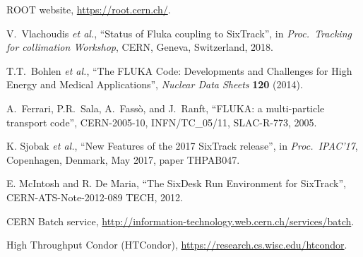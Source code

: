 \documentclass[a4paper,
              ]{jacow}
\begin{document}
\begin{thebibliography}{99}
 ROOT website, 
\url{https://root.cern.ch/}.


V.~Vlachoudis \emph{et al.}, ``Status of Fluka coupling to SixTrack'', in \emph{Proc.~Tracking for collimation Workshop}, CERN, Geneva, Switzerland, 2018.
 

T.T.~Bohlen \emph{et al.}, ``The FLUKA Code: Developments and Challenges for High Energy and Medical Applications'', {\it Nuclear Data Sheets} {\bf 120} (2014).
 
A.~Ferrari, P.R.~Sala, A.~Fass\`o, and J.~Ranft, ``FLUKA: a multi-particle transport code'', CERN-2005-10, INFN/TC\_05/11, SLAC-R-773, 2005.

K. Sjobak {\it et al.}, ``New Features of the 2017 SixTrack release'', in \textit{Proc.~IPAC'17}, Copenhagen, Denmark, May 2017, paper THPAB047.




E. McIntosh and R. De Maria, ``The SixDesk Run Environment for SixTrack'', CERN-ATS-Note-2012-089 TECH, 2012.

CERN Batch service, \url{http://information-technology.web.cern.ch/services/batch}.

High Throughput Condor (HTCondor), \url{https://research.cs.wisc.edu/htcondor}.




\end{thebibliography}
\end{document}
